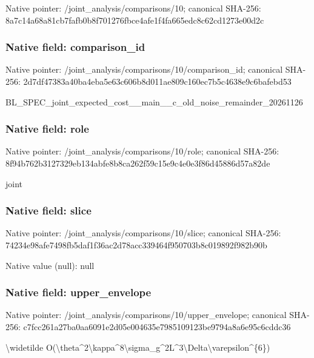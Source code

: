 \documentclass[10pt,a4paper]{article}
\begin{document}
Native pointer: /joint\_analysis/comparisons/10; canonical SHA-256: 8a7c14a68a81cb7fafb0b8f7\allowbreak{}01276fbce4afe1f4fa665edc\allowbreak{}8c62cd1273e00d2c



\subsubsection{Native field: comparison\_id}


Native pointer: /joint\_analysis/comparis\allowbreak{}ons/10/comparison\_id; canonical SHA-256: 2d7df47383a40ba4eba5e63c\allowbreak{}606b8d011ae809c160ec7b5c\allowbreak{}4638e9c6bafebd53


BL\_SPEC\_joint\_expected\_c\allowbreak{}ost\_\_main\_\_c\_old\_noise\_r\allowbreak{}emainder\_20261126


\subsubsection{Native field: role}


Native pointer: /joint\_analysis/comparisons/10/role; canonical SHA-256: 8f94b762b3127329eb134abf\allowbreak{}e8b8ca262f59c15e9c4e0e3f\allowbreak{}86d45886d57a82de


joint


\subsubsection{Native field: slice}


Native pointer: /joint\_analysis/comparisons/10/slice; canonical SHA-256: 74234e98afe7498fb5daf1f3\allowbreak{}6ac2d78acc339464f950703b\allowbreak{}8c019892f982b90b



Native value (null): null



\subsubsection{Native field: upper\_envelope}


Native pointer: /joint\_analysis/comparis\allowbreak{}ons/10/upper\_envelope; canonical SHA-256: c7fcc261a27ba0aa6091e2d0\allowbreak{}5e004635e7985109123be979\allowbreak{}4a8a6e95c6cddc36


\textbackslash{}widetilde O(\textbackslash{}theta\textasciicircum{}2\textbackslash{}kappa\textasciicircum{}8\textbackslash{}sigma\allowbreak{}\_g\textasciicircum{}2L\textasciicircum{}3\textbackslash{}Delta\textbackslash{}varepsilon\allowbreak{}\textasciicircum{}\{6\})
\end{document}
